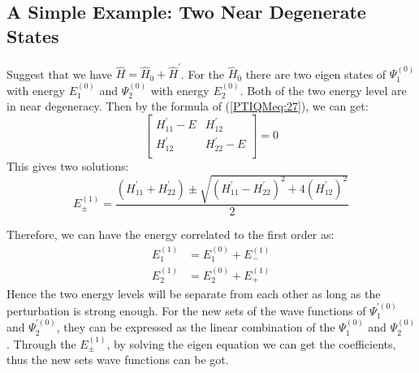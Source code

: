\subsection{A Simple Example: Two Near Degenerate States}
%
%
%
Suggest that we have $\hat{H} = \hat{H}_{0} + \hat{H}^{'}$. For the
$\hat{H}_{0}$ there are two eigen states of $\Psi^{(0)}_{1}$ with
energy $E^{(0)}_{1}$ and $\Psi^{(0)}_{2}$ with energy $E^{(0)}_{2}$.
Both of the two energy level are in near degeneracy. Then by the
formula of (\ref{PTIQMeq:27}), we can get:
\begin{equation}\label{}
\begin{bmatrix}
  H_{11}^{'} - E & H_{12}^{'} \\
  H_{12}^{'} & H_{22}^{'} - E \\
\end{bmatrix} = 0
\end{equation}
This gives two solutions:
\begin{equation}\label{}
E^{(1)}_{\pm} = \frac{(H_{11}^{'} + H_{22}^{'}) \pm
\sqrt{(H_{11}^{'} - H_{22}^{'})^{2} + 4(H_{12}^{'})^{2}}}{2}
\end{equation}

Therefore, we can have the energy correlated to the first order as:
\begin{align}\label{}
E^{(1)}_{1} &= E^{(0)}_{1} + E^{(1)}_{-} \nonumber \\
E^{(1)}_{2} &= E^{(0)}_{2} + E^{(1)}_{+}
\end{align}
Hence the two energy levels will be separate from each other as long
as the perturbation is strong enough. For the new sets of the wave
functions of $\Psi^{'(0)}_{1}$ and $\Psi^{'(0)}_{2}$, they can be
expressed as the linear combination of the $\Psi^{(0)}_{1}$ and
$\Psi^{(0)}_{2}$. Through the $E^{(1)}_{\pm}$, by solving the eigen
equation we can get the coefficients, thus the new sets wave
functions can be got.




